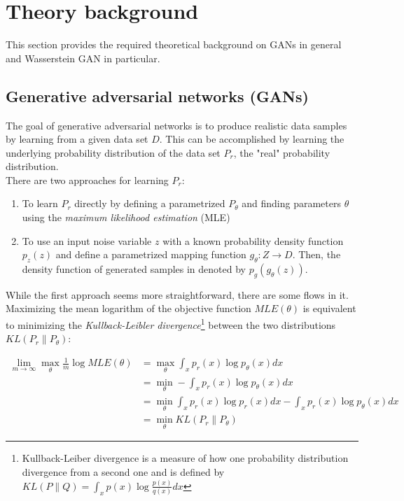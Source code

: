 \section{Theory background}
This section provides the required theoretical background on GANs in general and Wasserstein GAN in particular. 
\subsection{Generative adversarial networks (GANs)}
The goal of generative adversarial networks is to produce realistic data samples by learning from a given data set $D$. This can be accomplished by learning the underlying probability distribution of the data set $P_r$, the "real" probability distribution.\\
\indent There are two approaches for learning $P_r$:
\begin{enumerate}
	\item To learn $P_r$ directly by defining a parametrized $P_\theta$ and finding parameters $\theta$ using the \textit{maximum likelihood estimation} (MLE)
	\item To use an input noise variable $z$ with a known probability density function $p_z(z)$ and define a parametrized mapping function $g_\theta: Z \rightarrow D$. Then, the density function of generated samples in denoted by $p_g(g_\theta(z))$. 
\end{enumerate}

While the first approach seems more straightforward, there are some flows in it. Maximizing the mean logarithm of the objective function $MLE(\theta)$ is equivalent to minimizing the \textit{Kullback-Leibler divergence}\footnote{Kullback-Leiber divergence is a measure of how one probability distribution divergence from a second one and is defined by $KL(P \lVert Q) = \int_{x} p(x) \log \frac{p(x)}{q(x)} dx$} between the two distributions $KL(P_r \lVert P_\theta)$:

\begin{align*}
	\lim_{m \to \infty} \max_{\theta} \frac{1}{m} \log MLE(\theta)
	&= \max_\theta \int_x p_r(x) \log p_\theta(x) dx \\
	&= \min_\theta - \int_x p_r(x) \log p_\theta(x) dx \\
	&= \min_\theta \int_x p_r(x) \log p_r(x) dx - \int_x p_r(x) \log p_\theta(x) dx \\
	&= \min_\theta KL(P_r \lVert P_\theta)
\end{align*}

